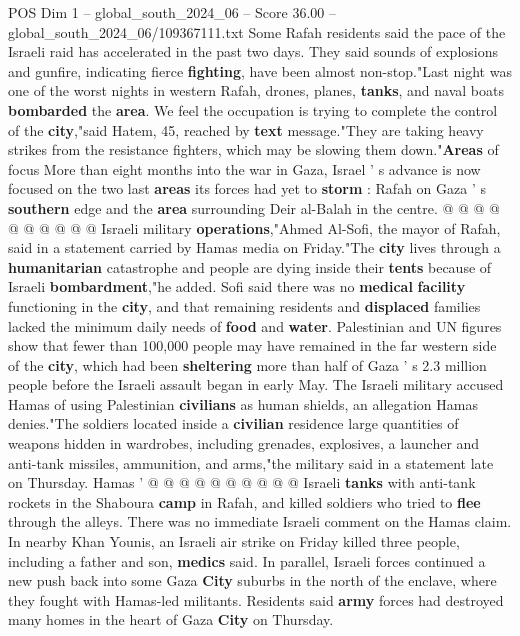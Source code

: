 \begin{textsample}{POS Dim 1 – global\_south\_2024\_06 – Score 36.00 – global\_south\_2024\_06/109367111.txt}
Some Rafah residents said the pace of the Israeli raid has accelerated in the past two days.
They said sounds of explosions and gunfire, indicating fierce \textbf{fighting}, have been almost non-stop."Last night was one of the worst nights in western Rafah, drones, planes, \textbf{tanks}, and naval boats \textbf{bombarded} the \textbf{area}.
We feel the occupation is trying to complete the control of the \textbf{city},"said Hatem, 45, reached by \textbf{text} message."They are taking heavy strikes from the resistance fighters, which may be slowing them down."\textbf{Areas} of focus More than eight months into the war in Gaza, Israel ' s advance is now focused on the two last \textbf{areas} its forces had yet to \textbf{storm} : Rafah on Gaza ' s \textbf{southern} edge and the \textbf{area} surrounding Deir al-Balah in the centre. @ @ @ @ @ @ @ @ @ @ Israeli military \textbf{operations},"Ahmed Al-Sofi, the mayor of Rafah, said in a statement carried by Hamas media on Friday."The \textbf{city} lives through a \textbf{humanitarian} catastrophe and people are dying inside their \textbf{tents} because of Israeli \textbf{bombardment},"he added.
Sofi said there was no \textbf{medical} \textbf{facility} functioning in the \textbf{city}, and that remaining residents and \textbf{displaced} families lacked the minimum daily needs of \textbf{food} and \textbf{water}.
Palestinian and UN figures show that fewer than 100,000 people may have remained in the far western side of the \textbf{city}, which had been \textbf{sheltering} more than half of Gaza ' s 2.3 million people before the Israeli assault began in early May.
The Israeli military accused Hamas of using Palestinian \textbf{civilians} as human shields, an allegation Hamas denies."The soldiers located inside a \textbf{civilian} residence large quantities of weapons hidden in wardrobes, including grenades, explosives, a launcher and anti-tank missiles, ammunition, and arms,"the military said in a statement late on Thursday.
Hamas ' @ @ @ @ @ @ @ @ @ @ Israeli \textbf{tanks} with anti-tank rockets in the Shaboura \textbf{camp} in Rafah, and killed soldiers who tried to \textbf{flee} through the alleys.
There was no immediate Israeli comment on the Hamas claim.
In nearby Khan Younis, an Israeli air strike on Friday killed three people, including a father and son, \textbf{medics} said.
In parallel, Israeli forces continued a new push back into some Gaza \textbf{City} suburbs in the north of the enclave, where they fought with Hamas-led militants.
Residents said \textbf{army} forces had destroyed many homes in the heart of Gaza \textbf{City} on Thursday.

\end{textsample}
